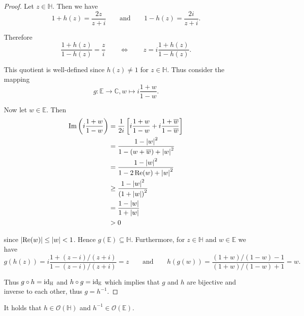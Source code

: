 \begin{enumerate}[label = \textbf{Exercise \arabic*.},wide = 0pt, itemsep=1.5ex]
	\begin{proof}
	Let $z \in \mathbb{H}$. Then we have 
	\begin{equation}
		1 + h(z) = \frac{2z}{z + i} \qquad \text{and} \qquad 1 - h(z) = \frac{2i}{z + i}.
	\end{equation}

	Therefore
	\begin{equation}
		\frac{1 + h(z)}{1 - h(z)} = \frac{z}{i} \qquad \Leftrightarrow \qquad z = i\frac{1 + h(z)}{1 - h(z)}.
	\end{equation}

	This quotient is well-defined since $h(z) \neq 1$ for $z \in \mathbb{H}$. Thus consider the mapping
	\begin{equation*}
		g: \mathbb{E} \to \mathbb{C}, w \mapsto i\frac{1 + w}{1 - w}.	
	\end{equation*}
	
	Now let $w \in \mathbb{E}$. Then
	\begin{align*}
		\Im\del[3]{i\frac{1 + w}{1 - w}} &= \frac{1}{2i}\sbr[3]{i\frac{1 + w}{1 - w} + i\frac{1 + \overline{w}}{1 - \overline{w}}}\\
		&= \frac{1 - \abs[0]{w}^2}{1 - (w + \overline{w}) + \abs[0]{w}^2}\\
		&= \frac{1 - \abs[0]{w}^2}{1 - 2\Re(w) + \abs[0]{w}^2}\\
		&\geq \frac{1 - \abs[0]{w}^2}{\del[0]{1 + \abs[0]{w}}^2}\\
		&= \frac{1 - \abs[0]{w}}{1 + \abs[0]{w}}\\
		&> 0
	\end{align*}

	\noindent since $\abs[0]{\Re(w)} \leq \abs[0]{w} < 1$. Hence $g(\mathbb{E}) \subseteq \mathbb{H}$. Furthermore, for $z \in \mathbb{H}$ and $w \in \mathbb{E}$ we have
	\begin{equation*}
		g(h(z)) = i\frac{1 + (z - i)/(z + i)}{1 - (z - i)/(z + i)} = z \qquad \text{and} \qquad h(g(w)) = \frac{(1 + w)/(1-w)- 1}{(1 + w)/(1-w) + 1} = w.
	\end{equation*}

	Thus $g \circ h = \operatorname{id}_{\mathbb{H}}$ and $h \circ g = \operatorname{id}_{\mathbb{E}}$ which implies that $g$ and $h$ are bijective and inverse to each other, thus $g = h^{-1}$.	
	\end{proof}
	
	\begin{lemma}
		It holds that $h \in \mathcal{O}(\mathbb{H})$ and $h^{-1} \in \mathcal{O}(\mathbb{E})$.
		\label{lem:holo}
	\end{lemma}


\end{enumerate}
